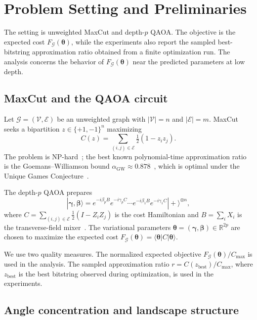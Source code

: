 \documentclass[aps,prx,reprint,superscriptaddress,longbibliography]{revtex4-2}
\newcommand{\ket}[1]{|#1\rangle}
\newcommand{\bra}[1]{\langle#1|}
\newcommand{\QAOA}{\textnormal{\textsc{QAOA}}}
\newcommand{\calG}{\mathcal{G}}
\newcommand{\calV}{\mathcal{V}}
\newcommand{\calE}{\mathcal{E}}
\newcommand{\bbR}{\mathbb{R}}
\begin{document}
\section{Problem Setting and Preliminaries}
\label{sec:background}

The setting is unweighted MaxCut and depth-$p$ \QAOA{}. The objective is
the expected cost $F_\calG(\bm\theta)$, while the experiments also
report the sampled best-bitstring approximation ratio obtained from a
finite optimization run. The analysis concerns the behavior of
$F_\calG(\bm\theta)$ near the predicted parameters at low depth.

\subsection{MaxCut and the \QAOA{} circuit}

Let $\calG = (\calV,\calE)$ be an unweighted graph with
$|\calV| = n$ and $|\calE| = m$. MaxCut seeks a bipartition
$z \in \{+1,-1\}^n$ maximizing
\begin{equation}
    C(z) = \sum_{(i,j) \in \calE} \tfrac{1}{2}(1 - z_i z_j).
    \label{eq:maxcut}
\end{equation}
The problem is NP-hard~\cite{karp1972}; the best known polynomial-time
approximation ratio is the Goemans--Williamson bound
$\alpha_{\mathrm{GW}} \approx 0.878$~\cite{goemans1995}, which is
optimal under the Unique Games Conjecture~\cite{hastad2001,khot2007}.

The depth-$p$ \QAOA{} prepares
\begin{equation}
    \ket{\bm\gamma,\bm\beta}
    = e^{-i\beta_p B} e^{-i\gamma_p C} \cdots
    e^{-i\beta_1 B} e^{-i\gamma_1 C}
    \ket{+}^{\otimes n},
    \label{eq:qaoa_state}
\end{equation}
where $C = \sum_{(i,j)\in\calE}\frac{1}{2}(I - Z_i Z_j)$ is the cost
Hamiltonian and $B = \sum_i X_i$ is the transverse-field mixer~\cite{farhi2014}.
The variational parameters $\bm\theta = (\bm\gamma,\bm\beta) \in
\bbR^{2p}$ are chosen to maximize the expected cost
$F_\calG(\bm\theta) = \bra{\bm\theta}C\ket{\bm\theta}$.

We use two quality measures. The normalized expected objective
$F_\calG(\bm\theta)/C_{\max}$ is used in the analysis. The sampled
approximation ratio
$r = C(z_{\mathrm{best}})/C_{\max}$, where $z_{\mathrm{best}}$ is the
best bitstring observed during optimization, is used in the
experiments.

\subsection{Angle concentration and landscape structure}
\label{sec:concentration_bg}
\end{document}
